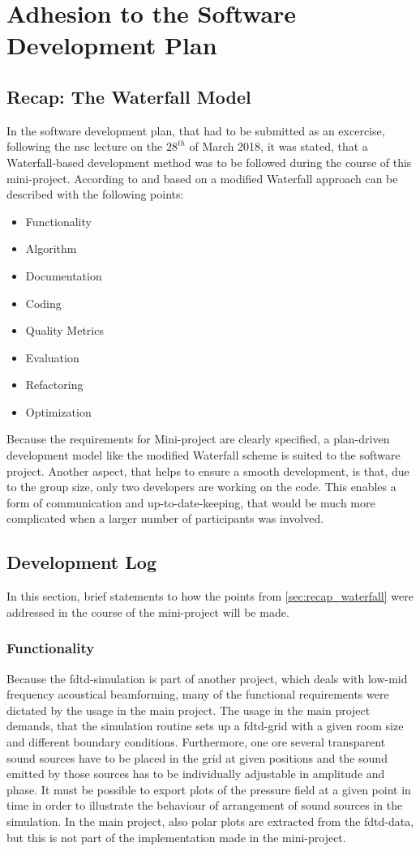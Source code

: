 \chapter{Adhesion to the Software Development Plan}\label{ch:sdp}
\section{Recap: The Waterfall Model}\label{sec:recap_waterfall}
In the software development plan, that had to be submitted as an excercise, following the \gls{nsc} lecture on the $28^{th}$ of March 2018, it was stated, that a Waterfall-based development method was to be followed during the course of this mini-project.
According to \citep[p. 141]{preview} and based on \citep{royce70} a modified Waterfall approach can be described with the following points:\\
\begin{itemize}
\item Functionality
\item Algorithm
\item Documentation
\item Coding
\item Quality Metrics
\item Evaluation
\item Refactoring
\item Optimization
\end{itemize}
Because the requirements for Mini-project are clearly specified, a plan-driven development model like the modified Waterfall scheme is suited to the software project. Another aspect, that helps to ensure a smooth development, is that, due to the group size, only two developers are working on the code. This enables a form of communication and up-to-date-keeping, that would be much more complicated when a larger number of participants was involved.
\section{Development Log}\label{sec:dev_log}
In this section, brief statements to how the points from \autoref{sec:recap_waterfall} were addressed in the course of the mini-project will be made.
\subsection{Functionality}\label{ssec:functionality}
Because the \gls{fdtd}-simulation is part of another project, which deals with low-mid frequency acoustical beamforming, many of the functional requirements were dictated by the usage in the main project. The usage in the main project demands, that the simulation routine sets up a \gls{fdtd}-grid with a given room size and different boundary conditions. Furthermore, one ore several transparent sound sources have to be placed in the grid at given positions and the sound emitted by those sources has to be individually adjustable in amplitude and phase. It must be possible to export plots of the pressure field at a given point in time in order to illustrate the behaviour of arrangement of sound sources in the simulation. In the main project, also polar plots are extracted from the \gls{fdtd}-data, but this is not part of the implementation made in the mini-project.
